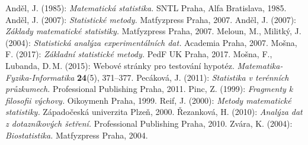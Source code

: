 \renewcommand{\refname}{Literatura}
\begin{thebibliography}{10}
\setlength\itemsep{2pt}
\frenchspacing
{} Anděl, J. (1985): {\it Matematická statistika.} SNTL Praha, Alfa Bratislava, 1985.
 Anděl, J. (2007): {\it Statistické metody.} Matfyzpress Praha, 2007.
 Anděl, J. (2007): {\it Základy matematické statistiky.} Matfyzpress Praha, 2007.
 Meloun, M., Militký, J. (2004): {\it Statistická analýza experimentálních dat.} Academia Praha, 2007.
 Mošna, F. (2017): {\it Základní statistické metody.} PedF UK Praha, 2017.
 Mošna, F., Lubanda, D.\,M. (2015): Webové stránky pro testování hypotéz. {\it Matematika-Fyzika-Informatika} {\bf 24}(5), 371--377.
 Pecáková, J. (2011): {\it Statistika v terénních průzkumech.} Professional Publishing Praha, 2011.
 Pinc, Z. (1999): {\it Fragmenty k filosofii výchovy.} Oikoymenh Praha, 1999.
 Reif, J. (2000): {\it Metody matematické statistiky.} Západočeská univerzita Plzeň, 2000.
 Řezanková, H. (2010): {\it Analýza dat z dotazníkových šetření.} Professional Publishing Praha, 2010.
 Zvára, K. (2004): {\it Biostatistika.} Matfyzpress Praha, 2004.
\end{thebibliography}


